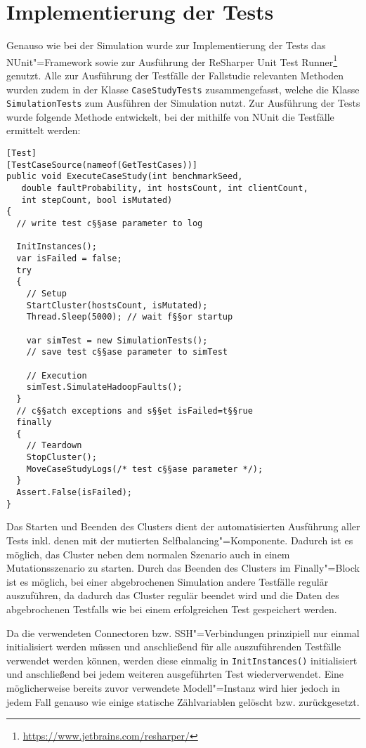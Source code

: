 \section{Implementierung der Tests}
\label{sec:implTestcases}

Genauso wie bei der Simulation wurde zur Implementierung  der Tests das NUnit"=Framework sowie zur Ausführung der ReSharper Unit Test Runner\footnote{\url{https://www.jetbrains.com/resharper/}} genutzt.
Alle zur Ausführung der Testfälle der Fallstudie relevanten Methoden wurden zudem in der Klasse \texttt{CaseStudyTests} zusammengefasst, welche die Klasse \texttt{SimulationTests} zum Ausführen der Simulation nutzt.
Zur Ausführung der Tests wurde folgende Methode entwickelt, bei der mithilfe von NUnit die Testfälle ermittelt werden:

\begin{lstlisting}[label=lst:executeTestCases,style=cs,
caption={[Methode zur Ausführung der Tests der Fallstudie]
    Methode zur Ausführung der Tests der Fallstudie (gekürzt)}]
[Test]
[TestCaseSource(nameof(GetTestCases))]
public void ExecuteCaseStudy(int benchmarkSeed,
   double faultProbability, int hostsCount, int clientCount,
   int stepCount, bool isMutated)
{
  // write test c§§ase parameter to log
  
  InitInstances();
  var isFailed = false;
  try
  {
    // Setup
    StartCluster(hostsCount, isMutated);
    Thread.Sleep(5000); // wait f§§or startup
    
    var simTest = new SimulationTests();
    // save test c§§ase parameter to simTest
    
    // Execution
    simTest.SimulateHadoopFaults();
  }
  // c§§atch exceptions and s§§et isFailed=t§§rue
  finally
  {
    // Teardown
    StopCluster();
    MoveCaseStudyLogs(/* test c§§ase parameter */);
  }
  Assert.False(isFailed);
}
\end{lstlisting}

Das Starten und Beenden des Clusters dient der automatisierten Ausführung aller Tests inkl. denen mit der mutierten Selfbalancing"=Komponente.
Dadurch ist es möglich, das Cluster neben dem normalen Szenario auch in einem Mutationsszenario zu starten.
Durch das Beenden des Clusters im Finally"=Block ist es möglich, bei einer abgebrochenen Simulation andere Testfälle regulär auszuführen, da dadurch das Cluster regulär beendet wird und die Daten des abgebrochenen Testfalls wie bei einem erfolgreichen Test gespeichert werden.

Da die verwendeten Connectoren bzw. SSH"=Verbindungen prinzipiell nur einmal initialisiert werden müssen und anschließend für alle auszuführenden Testfälle verwendet werden können, werden diese einmalig in \texttt{InitInstances()} initialisiert und anschließend bei jedem weiteren ausgeführten Test wiederverwendet.
Eine möglicherweise bereits zuvor verwendete Modell"=Instanz wird hier jedoch in jedem Fall genauso wie einige statische Zählvariablen gelöscht bzw. zurückgesetzt.

